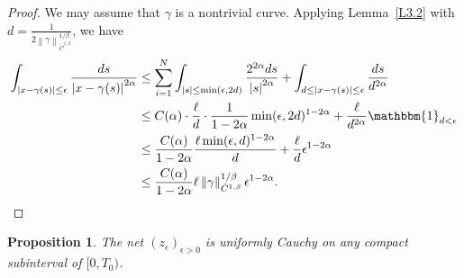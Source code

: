 \documentclass[reqno,centertags,12pt]{amsart}
\newtheorem{proposition}[theorem]{Proposition}
\theoremstyle{definition}
\numberwithin{equation}{section}
\newcommand{\abs}[1]{\left\lvert#1\right\rvert}
\newcommand{\norm}[1]{\left\|#1\right\|}
\newcommand{\seq}[1]{\left( #1 \right)}
\begin{document}
\begin{proof}
    We may assume that $\gamma$ is a nontrivial curve.
    Applying Lemma~\ref{L3.2} with
    $d = \frac{1}{2\norm{\gamma}_{\dot{C}^{1,\beta}}^{1/\beta}}$, we have
    \begin{align*}
        \int_{\abs{x - \gamma(s)}\leq\epsilon}\frac{ds}{\abs{x - \gamma(s)}^{2\alpha}}
        &\leq \sum_{i=1}^{N}\int_{\abs{s}\leq \min(\epsilon,2d)}
        \frac{2^{2\alpha}ds}{\abs{s}^{2\alpha}}
        + \int_{d\leq \abs{x - \gamma(s)}\leq \epsilon}\frac{ds}{d^{2\alpha}} \\
        &\leq C(\alpha)\cdot \frac{\ell}{d}\cdot \frac{1}{1-2\alpha}
        \min(\epsilon,2d)^{1-2\alpha}
        + \frac{\ell}{d^{2\alpha}}\mathbbm{1}_{d<\epsilon} \\
        &\leq \frac{C(\alpha)}{1-2\alpha}\frac{\ell\min(\epsilon,d)^{1-2\alpha}}{d}
        + \frac{\ell}{d}\epsilon^{1-2\alpha} \\
        &\leq \frac{C(\alpha)}{1-2\alpha}
        \ell\norm{\gamma}_{\dot{C}^{1,\beta}}^{1/\beta}\epsilon^{1-2\alpha}.
    \end{align*}
\end{proof}

\begin{proposition}
    The net $\seq{z_{\epsilon}}_{\epsilon>0}$ is uniformly Cauchy
    on any compact subinterval of $[0,T_{0})$.
\end{proposition}
\end{document}
